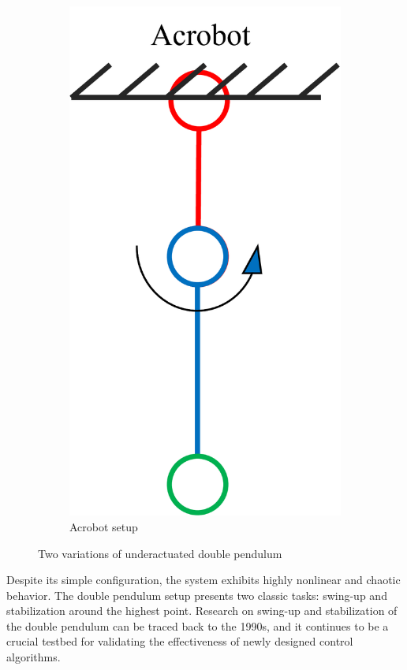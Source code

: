 \begin{figure}[htbp]
\begin{subfigure}[b]{0.2\textwidth}
        \includegraphics[width=\textwidth]{figures/Acrobot_explained.png}
        \caption{Acrobot setup}
        \label{acrobot_explained}
    \end{subfigure}
    \caption{Two variations of underactuated double pendulum}
\end{figure}

Despite its simple configuration, the system exhibits highly nonlinear and chaotic behavior\cite{shinbrot1992chaos}. The double pendulum setup presents two classic tasks: swing-up and stabilization around the highest point. Research on swing-up and stabilization of the double pendulum can be traced back to the 1990s\cite{yamakita1995robust}, and it continues to be a crucial testbed for validating the effectiveness of newly designed control algorithms\cite{xin2004new}\cite{zheng2006control}\cite{albahkali2009swing}.

